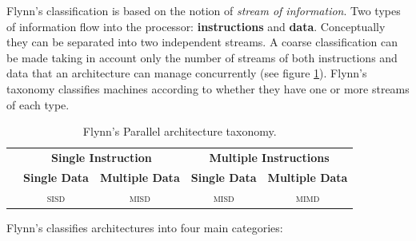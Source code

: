 Flynn's classification is based on the notion of  \textit{stream of information}.
Two types of information flow into the processor: \textbf{instructions} and \textbf{data}.
Conceptually they can be separated into two independent streams.
A coarse classification can be made taking in account only the number of streams of both instructions and
data that an architecture can manage concurrently (see figure \ref{fig:parallelClassification1}).
Flynn's taxonomy classifies machines according to whether they have one or more streams of each type.
\begin{table}
		\caption[Flynn's Parallel architecture taxonomy]{Flynn's Parallel architecture taxonomy.}
	\label{fig:parallelClassification1}
	\begin{tabular}{lcccc}\toprule
		&\multicolumn{2}{c}{\textbf{\textsf{Single Instruction}}}&\multicolumn{2}{c}{\textbf{\textsf{Multiple Instructions}}}
		\\\cmidrule(r){2-3}\cmidrule(r){4-5}   
		&\textbf{\textsf{Single Data}}&\textbf{\textsf{Multiple Data}}&\textbf{\textsf{Single Data}}&\textbf{\textsf{Multiple Data}}\\\midrule
		& \textsc{sisd} & \textsc{misd}
		& \textsc{misd} & \textsc{mimd}
		\\\bottomrule
	\end{tabular}

\end{table}
Flynn's classifies architectures into four main categories:
